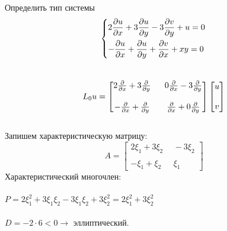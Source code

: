 \documentclass[../main.tex]{subfiles}
\begin{document}
\begin{example}
	Определить тип системы
	$$
		\begin{dcases}
			2\frac{\partial u}{\partial x} + 3\frac{\partial u}{\partial y}-3\frac{\partial v}{\partial y}+u=0 \\
			-\frac{\partial u}{\partial x} + \frac{\partial u}{\partial y}+\frac{\partial v}{\partial x}+xy=0
		\end{dcases} \\
	$$ \\
	$$L_{0}u = \begin{bmatrix}
			2\pderiv{}{x}+3\pderiv{}{y} \  & \ 0\pderiv{}{x}-3\pderiv{}{y}  \\\\
			-\pderiv{}{x}+\pderiv{}{y}\     & \ \pderiv{}{x} + 0\pderiv{}{y}
		\end{bmatrix}\begin{bmatrix}
			u \\\\ v
		\end{bmatrix}$$ \\
	Запишем характеристическую матрицу:
	$$A = \begin{bmatrix}
			2\xi_1+3\xi_2 \   & \ -3\xi_2 \\ \\
			-\xi_1 + \xi_2 \  & \ \xi_1
		\end{bmatrix}$$
	Характеристический многочлен:\\ \\
	$P = 2\xi_1^2 + 3\xi_1\xi_2-3\xi_1\xi_2+3\xi_2^2=2\xi_1^2+3\xi_2^2$ \\ \\
	$D = -2\cdot6<0\rightarrow $ эллиптический.
\end{example}
\end{document}
